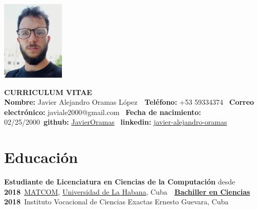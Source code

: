 \documentclass{article}
\begin{document}
\pagestyle{empty} %

\begin{center}
\begin{minipage}[t]{0.2\textwidth}
\vspace{0pt}
\includegraphics[width=3cm]{img.png}
\end{minipage}
\hspace{1cm}
\begin{minipage}[t]{0.7\textwidth}
\vspace{0pt}
\textbf{CURRICULUM VITAE}\\
\textbf{Nombre:} Javier Alejandro Oramas López\
\
\textbf{Teléfono:} +53 59334374 \
\textbf{Correo electrónico:} javiale2000@gmail.com \
\textbf{Fecha de nacimiento:} 02/25/2000\
\textbf{github:} \href{https://github.com/JavierOramas}{JavierOramas} \
\textbf{linkedin:} \href{https://www.linkedin.com/in/javier-alejandro-oramas-l%C3%B3pez-7ab47b160/}{javier-alejandro-oramas} \
\end{minipage}
\end{center}

\section*{Educación}
\textbf{Estudiante de Licenciatura en Ciencias de la Computación} \hfill desde \textbf{2018}\
\href{https://matcom.in/}{MATCOM}, \href{https://uh.cu}{Universidad de La Habana}, Cuba\
\vspace{0.1cm}\
\textbf{\hyperref[sec:bachelor]{Bachiller en Ciencias}} \hfill \textbf{2018}\
Instituto Vocacional de Ciencias Exactas Ernesto Guevara, Cuba

\end{document}
